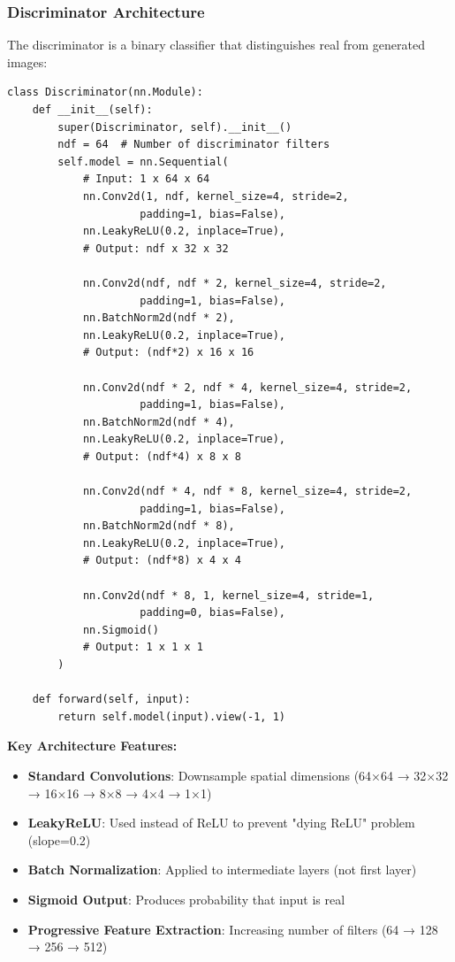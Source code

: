 \documentclass[conference,12pt]{IEEEtran}
\begin{document}
\subsubsection{Discriminator Architecture}

The discriminator is a binary classifier that distinguishes real from generated images:

\begin{lstlisting}[caption={Discriminator Network Implementation}]
class Discriminator(nn.Module):
    def __init__(self):
        super(Discriminator, self).__init__()
        ndf = 64  # Number of discriminator filters
        self.model = nn.Sequential(
            # Input: 1 x 64 x 64
            nn.Conv2d(1, ndf, kernel_size=4, stride=2, 
                     padding=1, bias=False),
            nn.LeakyReLU(0.2, inplace=True),
            # Output: ndf x 32 x 32

            nn.Conv2d(ndf, ndf * 2, kernel_size=4, stride=2, 
                     padding=1, bias=False),
            nn.BatchNorm2d(ndf * 2),
            nn.LeakyReLU(0.2, inplace=True),
            # Output: (ndf*2) x 16 x 16

            nn.Conv2d(ndf * 2, ndf * 4, kernel_size=4, stride=2, 
                     padding=1, bias=False),
            nn.BatchNorm2d(ndf * 4),
            nn.LeakyReLU(0.2, inplace=True),
            # Output: (ndf*4) x 8 x 8

            nn.Conv2d(ndf * 4, ndf * 8, kernel_size=4, stride=2, 
                     padding=1, bias=False),
            nn.BatchNorm2d(ndf * 8),
            nn.LeakyReLU(0.2, inplace=True),
            # Output: (ndf*8) x 4 x 4

            nn.Conv2d(ndf * 8, 1, kernel_size=4, stride=1, 
                     padding=0, bias=False),
            nn.Sigmoid()
            # Output: 1 x 1 x 1
        )

    def forward(self, input):
        return self.model(input).view(-1, 1)
\end{lstlisting}

\textbf{Key Architecture Features:}
\begin{itemize}
    \item \textbf{Standard Convolutions}: Downsample spatial dimensions (64×64 → 32×32 → 16×16 → 8×8 → 4×4 → 1×1)
    \item \textbf{LeakyReLU}: Used instead of ReLU to prevent "dying ReLU" problem (slope=0.2)
    \item \textbf{Batch Normalization}: Applied to intermediate layers (not first layer)
    \item \textbf{Sigmoid Output}: Produces probability that input is real
    \item \textbf{Progressive Feature Extraction}: Increasing number of filters (64 → 128 → 256 → 512)
\end{itemize}
\end{document}
